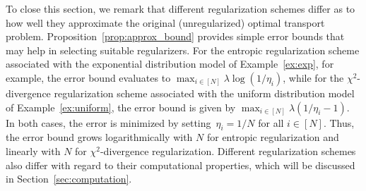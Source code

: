 \documentclass[11pt, a4paper, oneside, reqno]{article}
\begin{document}
	To close this section, we remark that different regularization schemes differ as to how well they approximate the original (unregularized) optimal transport problem. Proposition~\ref{prop:approx_bound} provides simple error bounds that may help in selecting suitable regularizers. For the entropic regularization scheme associated with the exponential distribution model of Example~\ref{ex:exp}, for example, the error bound evaluates to
    $\max_{i\in [N]}\lambda \log(1/\eta_i)$, while for the $\chi^2$-divergence regularization scheme associated with the uniform distribution model of Example~\ref{ex:uniform}, the error bound is given by $\max_{i \in [N]}\lambda (1/\eta_i - 1)$. In both cases, the error is minimized by setting~$\eta_i = 1/N $ for all $i \in [N]$. Thus, the error bound grows logarithmically with $N$ for entropic regularization and linearly with $N$ for $\chi^2$-divergence regularization. Different regularization schemes also differ with regard to their computational properties, which will be discussed in Section~\ref{sec:computation}.
    
\end{document}
